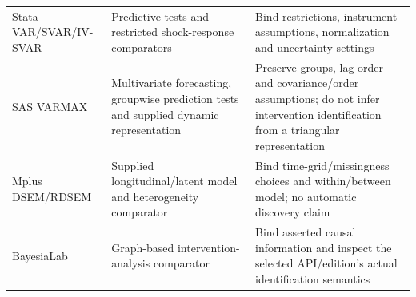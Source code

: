 \begin{longtable}[]{@{}lll@{}}
\begin{minipage}[t]{0.30\columnwidth}
Stata VAR/SVAR/IV-SVAR\strut
\end{minipage} & \begin{minipage}[t]{0.30\columnwidth}\raggedright
Predictive tests and restricted shock-response comparators\strut
\end{minipage} & \begin{minipage}[t]{0.30\columnwidth}\raggedright
Bind restrictions, instrument assumptions, normalization and uncertainty
settings\strut
\end{minipage}\tabularnewline
\begin{minipage}[t]{0.30\columnwidth}\raggedright
SAS VARMAX\strut
\end{minipage} & \begin{minipage}[t]{0.30\columnwidth}\raggedright
Multivariate forecasting, groupwise prediction tests and supplied
dynamic representation\strut
\end{minipage} & \begin{minipage}[t]{0.30\columnwidth}\raggedright
Preserve groups, lag order and covariance/order assumptions; do not
infer intervention identification from a triangular representation\strut
\end{minipage}\tabularnewline
\begin{minipage}[t]{0.30\columnwidth}\raggedright
Mplus DSEM/RDSEM\strut
\end{minipage} & \begin{minipage}[t]{0.30\columnwidth}\raggedright
Supplied longitudinal/latent model and heterogeneity comparator\strut
\end{minipage} & \begin{minipage}[t]{0.30\columnwidth}\raggedright
Bind time-grid/missingness choices and within/between model; no
automatic discovery claim\strut
\end{minipage}\tabularnewline
\begin{minipage}[t]{0.30\columnwidth}\raggedright
BayesiaLab\strut
\end{minipage} & \begin{minipage}[t]{0.30\columnwidth}\raggedright
Graph-based intervention-analysis comparator\strut
\end{minipage} & \begin{minipage}[t]{0.30\columnwidth}\raggedright
Bind asserted causal information and inspect the selected API/edition's
actual identification semantics\strut
\end{minipage}\tabularnewline
\bottomrule
\end{longtable}

